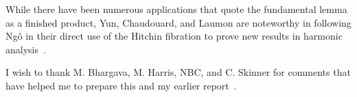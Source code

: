 \documentclass[brochure,english,12pt]{bourbaki}
\begin{document}

While there have been numerous applications that quote the fundamental
lemma as a finished product, Yun, Chaudouard, and Laumon are
noteworthy in following Ng\^o in their direct use of the Hitchin fibration to
prove new results in harmonic analysis~\cite{Yun:2009}.


I wish to thank M. Bhargava, M. Harris, NBC, and C. Skinner for comments that
have helped me to prepare this and my earlier report~\cite{thales:NBC:2011}.
 

\raggedright

\end{document}

